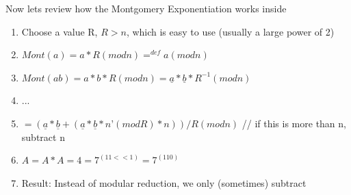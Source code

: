 Now lets review how the Montgomery Exponentiation works inside
\begin{enumerate}
	\item  Choose a value R, \(R>n\), which is easy to use (usually a large power of 2)
	\item  \(Mont(a)=a*R(mod n) =^{def}  a(mod n)\)
	\item  \(Mont(ab)=a*b*R(mod n)=\underline{a}*\underline{b}*R^{-1} (mod n)\)
	\item  \(... \)
	\item  \( = (\underline{a}*\underline{b} + (\underline{a}*\underline{b}*n’(mod R)*n))/R(modn) \) \newline
	// if this is more than n, subtract n
	\item  \( A = A*A = 4 = 7^{(11<<1)} = 7^{(110)} \)
	\item  Result: Instead of modular reduction, we only (sometimes) subtract
\end{enumerate}

